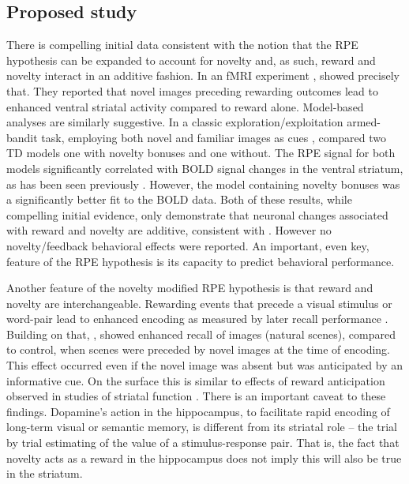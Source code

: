 \documentclass[doc]{apa}        %
\begin{document}
\subsection{Proposed study} %
\label{sub:proposed_study}

There is compelling initial data consistent with the notion that the RPE hypothesis can be expanded to account for novelty and, as such, reward and novelty interact in an additive fashion.  In an fMRI experiment , showed precisely that.  They reported that novel images preceding rewarding outcomes lead to enhanced ventral striatal activity compared to reward alone.  Model-based analyses are similarly suggestive. In a classic exploration/exploitation armed-bandit task, employing both novel and familiar images as cues , compared two TD models one with novelty bonuses and one without.  The RPE signal for both models significantly correlated with BOLD signal changes in the ventral striatum, as has been seen previously \cite{Seger:2010p7188,ODoherty:2003p6329,Haruno:2006p3979}.  However, the model containing novelty bonuses was a significantly better fit to the BOLD data.  Both of these results, while compelling initial evidence, only demonstrate that neuronal changes associated with reward and novelty are additive, consistent with .  However no novelty/feedback behavioral effects were reported.  An important, even key, feature of the RPE hypothesis is its capacity to predict behavioral performance.

Another feature of the novelty modified RPE hypothesis is that reward and novelty are interchangeable.  Rewarding events that precede a visual stimulus or word-pair lead to enhanced encoding as measured by later recall performance \cite{Lisman:2005p5455}.  Building on that, , showed enhanced recall of images (natural scenes), compared to control, when scenes were preceded by novel images at the time of encoding.  This effect occurred even if the novel image was absent but was anticipated by an informative cue.  On the surface this is similar to effects of reward anticipation observed in studies of striatal function \cite{Knutson:2001p5234}. There is an important caveat to these findings.  Dopamine's action in the hippocampus, to facilitate rapid encoding of long-term visual or semantic memory, is different from its striatal role -- the trial by trial estimating of the value of a stimulus-response pair.  That is, the fact that novelty acts as a reward in the hippocampus does not imply this will also be true in the striatum.
\end{document}
